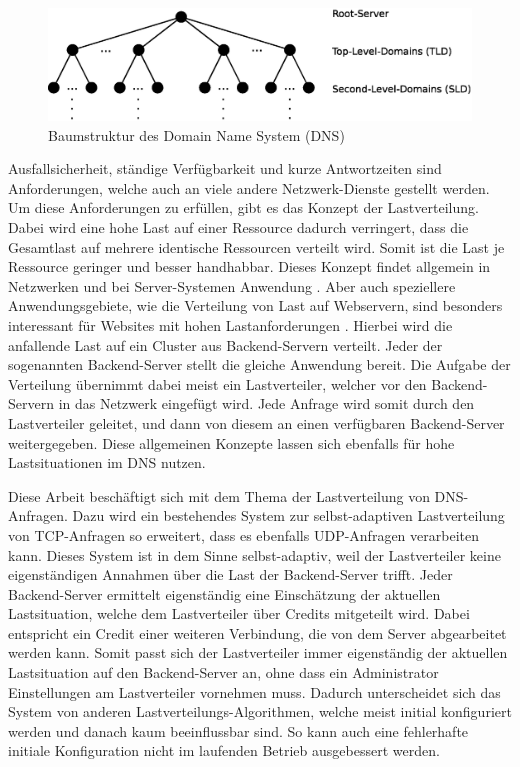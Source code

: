 \documentclass[a4paper, 12pt, BCOR10mm, DIV12, toc=bibliography, toc=listof, german]{scrbook}
\def \dns {Domain Name System (DNS)}
\begin{document}
		\begin{figure}
			\centering
			\includegraphics[width=\textwidth]{images/tree}
			\caption{Baumstruktur des \dns{}}
			\label{fig:tree}
		\end{figure}


		Ausfallsicherheit, ständige Verfügbarkeit und kurze Antwortzeiten sind Anforderungen, welche
		auch an viele andere Netzwerk-Dienste gestellt werden. Um diese Anforderungen zu erfüllen,
		gibt es das Konzept der Lastverteilung. Dabei wird eine hohe Last auf einer Ressource dadurch
		verringert, dass die Gesamtlast auf mehrere identische Ressourcen verteilt wird. Somit ist die
		Last je Ressource geringer und besser handhabbar. Dieses Konzept findet allgemein in Netzwerken
		und bei Server-Systemen Anwendung \cite{bourke2001, kopparapu2002}. Aber auch speziellere
		Anwendungsgebiete, wie die Verteilung von Last auf Webservern, sind besonders interessant für
		Websites mit hohen Lastanforderungen \cite{meplho2012}. Hierbei wird die anfallende Last auf ein
		Cluster aus Backend-Servern verteilt. Jeder der sogenannten Backend-Server stellt die
		gleiche Anwendung bereit. Die Aufgabe der Verteilung übernimmt dabei meist ein Lastverteiler,
		welcher vor den Backend-Servern in das Netzwerk eingefügt wird. Jede Anfrage wird somit durch
		den Lastverteiler geleitet, und dann von diesem an einen verfügbaren Backend-Server
		weitergegeben. Diese allgemeinen Konzepte lassen sich ebenfalls für hohe Lastsituationen im DNS
		nutzen.

		Diese Arbeit beschäftigt sich mit dem Thema der Lastverteilung von DNS-Anfragen. Dazu wird ein
		bestehendes System \cite{zinke2007,scsczile2008,zinke2012,salbnet} zur selbst-adaptiven
		Lastverteilung von TCP-Anfragen so erweitert, dass es ebenfalls UDP-Anfragen verarbeiten kann.
		Dieses System ist in dem Sinne selbst-adaptiv, weil der Lastverteiler keine eigenständigen
		Annahmen über die Last der Backend-Server trifft. Jeder Backend-Server ermittelt eigenständig
		eine Einschätzung der aktuellen Lastsituation, welche dem Lastverteiler über Credits
		mitgeteilt wird. Dabei entspricht ein Credit einer weiteren Verbindung, die von dem Server
		abgearbeitet werden kann. Somit passt sich der Lastverteiler immer eigenständig der aktuellen
		Lastsituation auf den Backend-Server an, ohne dass ein Administrator Einstellungen am
		Lastverteiler vornehmen muss.  Dadurch unterscheidet sich das System von anderen
		Lastverteilungs-Algorithmen, welche meist initial konfiguriert werden und danach kaum
		beeinflussbar sind. So kann auch eine fehlerhafte initiale Konfiguration nicht im laufenden
		Betrieb ausgebessert werden.
\end{document}
